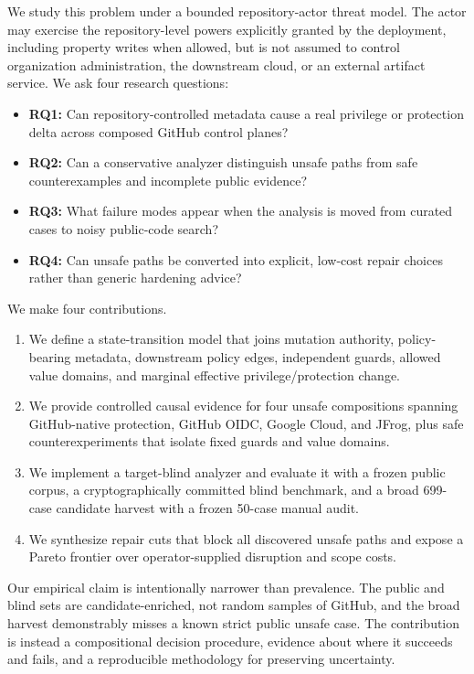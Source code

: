 \documentclass[sigconf,review,anonymous]{acmart}
\begin{document}
We study this problem under a bounded repository-actor threat model.  The actor
may exercise the repository-level powers explicitly granted by the deployment,
including property writes when allowed, but is not assumed to control
organization administration, the downstream cloud, or an external artifact
service.  We ask four research questions:

\begin{itemize}[leftmargin=*,nosep]
  \item \textbf{RQ1:} Can repository-controlled metadata cause a real privilege
  or protection delta across composed GitHub control planes?
  \item \textbf{RQ2:} Can a conservative analyzer distinguish unsafe paths from
  safe counterexamples and incomplete public evidence?
  \item \textbf{RQ3:} What failure modes appear when the analysis is moved from
  curated cases to noisy public-code search?
  \item \textbf{RQ4:} Can unsafe paths be converted into explicit, low-cost
  repair choices rather than generic hardening advice?
\end{itemize}

We make four contributions.

\begin{enumerate}[leftmargin=*,nosep]
  \item We define a state-transition model that joins mutation authority,
  policy-bearing metadata, downstream policy edges, independent guards, allowed
  value domains, and marginal effective privilege/protection change.
  \item We provide controlled causal evidence for four unsafe compositions
  spanning GitHub-native protection, GitHub OIDC, Google Cloud, and JFrog, plus
  safe counterexperiments that isolate fixed guards and value domains.
  \item We implement a target-blind analyzer and evaluate it with a frozen
  public corpus, a cryptographically committed blind benchmark, and a broad
  699-case candidate harvest with a frozen 50-case manual audit.
  \item We synthesize repair cuts that block all discovered unsafe paths and
  expose a Pareto frontier over operator-supplied disruption and scope costs.
\end{enumerate}

Our empirical claim is intentionally narrower than prevalence.  The public and
blind sets are candidate-enriched, not random samples of GitHub, and the broad
harvest demonstrably misses a known strict public unsafe case.  The contribution
is instead a compositional decision procedure, evidence about where it succeeds
and fails, and a reproducible methodology for preserving uncertainty.
\end{document}
